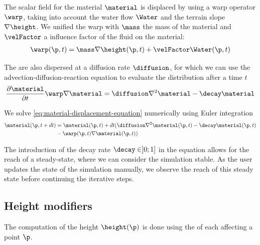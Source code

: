 The scalar field for the material $\material$ is displaced by using a warp operator $\warp$, taking into account the water flow $\Water$ and the terrain slope $\nabla \height$. We unified the warp with $\mass$ the mass of the material and $\velFactor$ a influence factor of the fluid on the material: 
\begin{align*}
    \warp(\p, t) = \mass \nabla \height(\p, t) + \velFactor \Water(\p, t)
\end{align*}
 
The  are also dispersed at a diffusion rate $\diffusion$, for which we can use the advection-diffusion-reaction equation to evaluate the distribution after a time $t$
\begin{align} 
	\label{eq:material-displacement-equation}
    \frac{\partial \material}{\partial t} \warp \nabla \material = \diffusion \nabla^2 \material - \decay \material
\end{align}

We solve \eqref{eq:material-displacement-equation} numerically using Euler integration
\begin{align}
    \material(\p, t + dt) &= \material(\p, t) + dt ( \diffusion \nabla^2 \material(\p, t) - \decay \material(\p, t) \\ & - \warp(\p, t) \nabla \material(\p, t) ) \nonumber
\end{align}

The introduction of the decay rate $\decay \in ]0; 1]$ in the equation allows for the reach of a steady-state, where we can consider the simulation stable. As the user updates the state of the simulation manually, we observe the reach of this steady state before continuing the iterative steps.

\subsection{Height modifiers}
The computation of the height $\height(\p)$ is done using the  of each  affecting a point $\p$.


